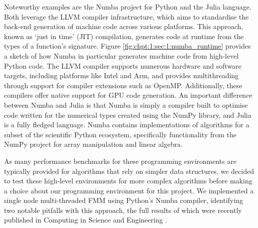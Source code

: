 Noteworthy examples are the Numba project for Python and the Julia language. Both leverage the LLVM compiler infrastructure, which aims to standardise the back-end generation of machine code across various platforms. This approach, known as `just in time' (JIT) compilation, generates code at runtime from the types of a function's signature. Figure \ref{fig:chpt:1:sec:1:numba_runtime} provides a sketch of how Numba in particular generates machine code from high-level Python code. The LLVM compiler supports numerous hardware and software targets, including platforms like Intel and Arm, and provides multithreading through support for compiler extensions such as OpenMP. Additionally, these compilers offer native support for GPU code generation. An important difference between Numba and Julia is that Numba is simply a compiler built to optimise code written for the numerical types created using the NumPy library, and Julia is a fully fledged language. Numba contains implementations of algorithms for a subset of the scientific Python ecosystem, specifically functionality from the NumPy project for array manipulation and linear algebra.

As many performance benchmarks for these programming environments are typically provided for algorithms that rely on simpler data structures, we decided to test these high-level environments for more complex algorithms before making a choice about our programming environment for this project. We implemented a single node multi-threaded FMM using Python's Numba compiler, identifying two notable pitfalls with this approach, the full results of which were recently published in Computing in Science and Engineering \cite{kailasa2022pyexafmm}.


